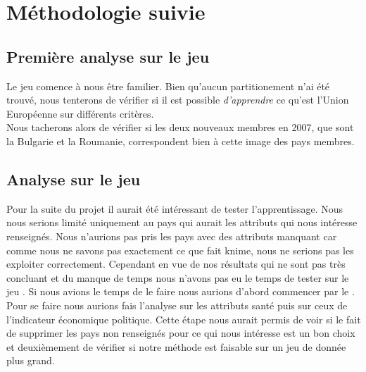 \section{Méthodologie suivie}

\subsection{Première analyse sur le jeu \jeuc}
Le jeu \jeuc comence à nous être familier. Bien qu'aucun partitionement n'ai été trouvé, nous tenterons de vérifier si il est possible \textit{d'apprendre} ce qu'est l'Union Européenne sur différents critères.\\ Nous tacherons alors de vérifier si les deux nouveaux membres en 2007, que sont la Bulgarie et la Roumanie, correspondent bien à cette image des pays membres.

\subsection{Analyse sur le jeu \jeua}
Pour la suite du projet il aurait été intéressant de tester l'apprentissage. Nous nous serions limité uniquement au pays qui aurait les attributs qui nous intéresse renseignés. Nous n'aurions pas pris les pays avec des attributs manquant car comme nous ne savons pas exactement ce que fait knime, nous ne serions pas les exploiter correctement. Cependant en vue de nos résultats qui ne sont pas très concluant et du manque de temps nous n'avons pas eu le temps de tester sur le jeu \jeua . Si nous avions le temps de le faire nous aurions d'abord commencer par le \jeub . Pour se faire nous aurions fais l'analyse sur les attributs santé puis sur ceux de l'indicateur économique politique. Cette étape nous aurait permis de voir si le fait de supprimer les pays non renseignés pour ce qui nous intéresse est un bon choix et deuxièmement de vérifier si notre méthode est faisable sur un jeu de donnée plus grand.


